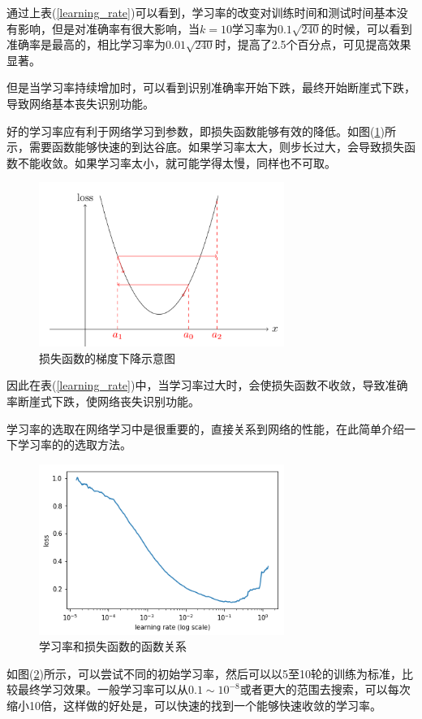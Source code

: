 \documentclass[UTF-8, a4paper, 12pt]{ctexart}
\begin{document}
通过上表(\ref{learning_rate})可以看到，学习率的改变对训练时间和测试时间基本没有影响，但是对准确率有很大影响，当$k=10$学习率为$0.1\sqrt{240}$的时候，可以看到准确率是最高的，相比学习率为$0.01\sqrt{240}$时，提高了2.5个百分点，可见提高效果显著。

但是当学习率持续增加时，可以看到识别准确率开始下跌，最终开始断崖式下跌，导致网络基本丧失识别功能。

好的学习率应有利于网络学习到参数，即损失函数能够有效的降低。如图(\ref{f7})所示，需要函数能够快速的到达谷底。如果学习率太大，则步长过大，会导致损失函数不能收敛。如果学习率太小，就可能学得太慢，同样也不可取。

\begin{figure}[htbp]
    \centering
    \includegraphics[width=8cm]{fig/f7.png}
    \caption{损失函数的梯度下降示意图}
    \label{f7}
\end{figure}

因此在表(\ref{learning_rate})中，当学习率过大时，会使损失函数不收敛，导致准确率断崖式下跌，使网络丧失识别功能。

学习率的选取在网络学习中是很重要的，直接关系到网络的性能，在此简单介绍一下学习率的的选取方法。
\begin{figure}[htbp]
    \centering
    \includegraphics[width=8cm]{fig/f8.png}
    \caption{学习率和损失函数的函数关系}
    \label{f8}
\end{figure}
如图(\ref{f8})所示，可以尝试不同的初始学习率，然后可以以5至10轮的训练为标准，比较最终学习效果。一般学习率可以从$0.1\sim 10^{-8}$或者更大的范围去搜索，可以每次缩小10倍，这样做的好处是，可以快速的找到一个能够快速收敛的学习率。\newline
\end{document}
